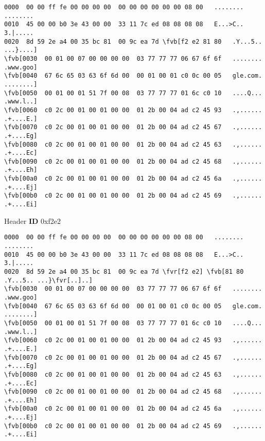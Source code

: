 \documentclass{beamer}
\newcommand*{\fvr}[1]{\textcolor{red}{#1}}
\newcommand*{\fvb}[1]{\textcolor{blue}{#1}}
\begin{document}

  \begin{frame}[fragile]{\mytitle}
    \tiny
    \begin{Verbatim}[commandchars=\\\[\]]
0000  00 00 ff fe 00 00 00 00  00 00 00 00 00 00 08 00   ........ ........
0010  45 00 00 b0 3e 43 00 00  33 11 7c ed 08 08 08 08   E...>C.. 3.|.....
0020  8d 59 2e a4 00 35 bc 81  00 9c ea 7d \fvb[f2 e2 81 80   .Y...5.. ...}....]
\fvb[0030  00 01 00 07 00 00 00 00  03 77 77 77 06 67 6f 6f   ........ .www.goo]
\fvb[0040  67 6c 65 03 63 6f 6d 00  00 01 00 01 c0 0c 00 05   gle.com. ........]
\fvb[0050  00 01 00 01 51 7f 00 08  03 77 77 77 01 6c c0 10   ....Q... .www.l..]
\fvb[0060  c0 2c 00 01 00 01 00 00  01 2b 00 04 ad c2 45 93   .,...... .+....E.]
\fvb[0070  c0 2c 00 01 00 01 00 00  01 2b 00 04 ad c2 45 67   .,...... .+....Eg]
\fvb[0080  c0 2c 00 01 00 01 00 00  01 2b 00 04 ad c2 45 63   .,...... .+....Ec]
\fvb[0090  c0 2c 00 01 00 01 00 00  01 2b 00 04 ad c2 45 68   .,...... .+....Eh]
\fvb[00a0  c0 2c 00 01 00 01 00 00  01 2b 00 04 ad c2 45 6a   .,...... .+....Ej]
\fvb[00b0  c0 2c 00 01 00 01 00 00  01 2b 00 04 ad c2 45 69   .,...... .+....Ei]
    \end{Verbatim}
\end{frame}

  \begin{frame}[fragile]{\mytitle}{Header}
    \textbf{ID} 0xf2e2
    \vfill
    \tiny
    \begin{Verbatim}[commandchars=\\\[\]]
0000  00 00 ff fe 00 00 00 00  00 00 00 00 00 00 08 00   ........ ........
0010  45 00 00 b0 3e 43 00 00  33 11 7c ed 08 08 08 08   E...>C.. 3.|.....
0020  8d 59 2e a4 00 35 bc 81  00 9c ea 7d \fvr[f2 e2] \fvb[81 80   .Y...5.. ...}\fvr[..]..]
\fvb[0030  00 01 00 07 00 00 00 00  03 77 77 77 06 67 6f 6f   ........ .www.goo]
\fvb[0040  67 6c 65 03 63 6f 6d 00  00 01 00 01 c0 0c 00 05   gle.com. ........]
\fvb[0050  00 01 00 01 51 7f 00 08  03 77 77 77 01 6c c0 10   ....Q... .www.l..]
\fvb[0060  c0 2c 00 01 00 01 00 00  01 2b 00 04 ad c2 45 93   .,...... .+....E.]
\fvb[0070  c0 2c 00 01 00 01 00 00  01 2b 00 04 ad c2 45 67   .,...... .+....Eg]
\fvb[0080  c0 2c 00 01 00 01 00 00  01 2b 00 04 ad c2 45 63   .,...... .+....Ec]
\fvb[0090  c0 2c 00 01 00 01 00 00  01 2b 00 04 ad c2 45 68   .,...... .+....Eh]
\fvb[00a0  c0 2c 00 01 00 01 00 00  01 2b 00 04 ad c2 45 6a   .,...... .+....Ej]
\fvb[00b0  c0 2c 00 01 00 01 00 00  01 2b 00 04 ad c2 45 69   .,...... .+....Ei]
    \end{Verbatim}
\end{frame}
\end{document}
